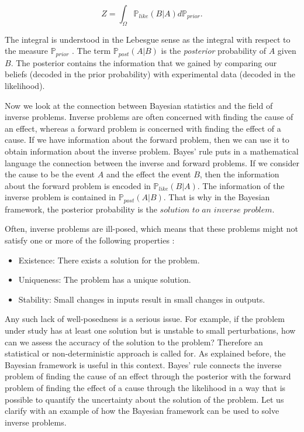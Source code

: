 \documentclass[12pt]{book}
\newcommand{\post}{\mathbb{P}_{post}}
\newcommand{\like}{\mathbb{P}_{like}}
\newcommand{\prior}{\mathbb{P}_{prior}}
\begin{document}
\begin{equation}\label{eqnNormalizationConstant}
Z=\int_{\Omega} \like(B|A)d\prior.
\end{equation}

The integral
is understood in the  Lebesgue sense as the  integral with respect to the measure $\prior$ \cite{lerner2014course}. 
The term $\post(A|B)$ is  the \textit{posterior} probability of $A$ given $B$. The posterior contains  the information 
that we gained by comparing our beliefs (decoded in the prior probability) with experimental data 
(decoded in the likelihood). 
\newline



Now we look at the connection between Bayesian statistics and  the field of inverse problems. 
Inverse problems are  often concerned with finding the cause of an effect, whereas a forward
problem is concerned with finding the effect of a cause. If we have information about the 
forward problem, then we can use it to obtain information about the inverse problem. Bayes' rule
puts in a mathematical language the connection between the inverse and forward problems. 
If we consider the cause to be the
event $A$ and the effect the event $B$, then the information about the forward problem
is encoded in $\like(B|A)$. The information of the inverse problem is contained in 
$\post(A|B)$. That is why in the Bayesian framework, the posterior probability
is the $\textit{solution to an inverse problem}$.

Often, inverse problems
are ill-posed, which means
that these problems might  not satisfy one or more of the following properties \cite{lebedev2012functional}:

\begin{itemize}
\item Existence: There exists a solution for the problem.
\item Uniqueness: The problem has a unique solution.
\item Stability: Small changes in inputs result in small changes in outputs.
\end{itemize}
Any such lack of well-posedness is a serious issue. For example, if the problem under study has at least one solution
but is unstable to small perturbations, how can we assess the accuracy of the solution to 
the problem?
Therefore an statistical or non-deterministic approach is called for. As explained before, the Bayesian framework 
is useful in this context. Bayes' rule connects the inverse problem  of finding the cause
of an effect through the posterior with the forward problem of finding the effect of a cause
through the likelihood in a way that is possible to quantify the uncertainty about the solution
of the problem. Let us  clarify with an example of how the Bayesian framework can be used to solve inverse problems. 
\newline
\end{document}
